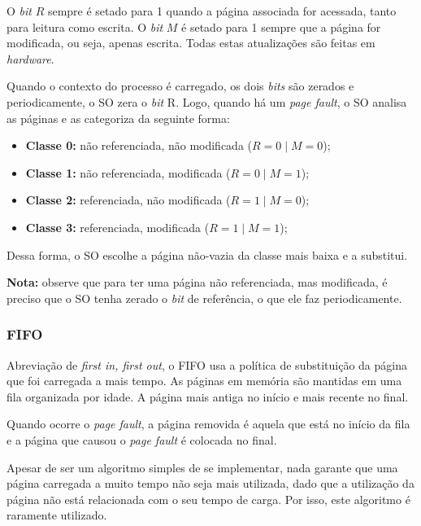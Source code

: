 O \textit{bit} $R$ sempre é setado para 1 quando a página associada for acessada, tanto para leitura como escrita. O \textit{bit} $M$ é setado para 1 sempre que a página for modificada, ou seja, apenas escrita. Todas estas atualizações são feitas em \textit{hardware}.

Quando o contexto do processo é carregado, os dois \textit{bits} são zerados e periodicamente, o SO zera o \textit{bit} R. Logo, quando há um \textit{page fault}, o SO analisa as páginas e as categoriza da seguinte forma:

\begin{itemize}
  \item \textbf{Classe 0:} não referenciada, não modificada ($R = 0 \mid M = 0$);

  \item \textbf{Classe 1:} não referenciada, modificada ($R = 0 \mid M = 1$);

  \item \textbf{Classe 2:} referenciada, não modificada ($R = 1 \mid M = 0$);

  \item \textbf{Classe 3:} referenciada, modificada ($R = 1 \mid M = 1$);
\end{itemize}

Dessa forma, o SO escolhe a página não-vazia da classe mais baixa e a substitui.

\textbf{Nota:} observe que para ter uma página não referenciada, mas modificada, é preciso que o SO tenha zerado o \textit{bit} de referência, o que ele faz periodicamente.



\subsubsection{FIFO}
Abreviação de \textit{first in, first out}, o FIFO usa a política de substituição da página que foi carregada a mais tempo. As páginas em memória são mantidas em uma fila organizada por idade. A página mais antiga no início e mais recente no final.

Quando ocorre o \textit{page fault}, a página removida é aquela que está no início da fila e a página que causou o \textit{page fault} é colocada no final.

Apesar de ser um algoritmo simples de se implementar, nada garante que uma página carregada a muito tempo não seja mais utilizada, dado que a utilização da página não está relacionada com o seu tempo de carga. Por isso, este algoritmo é raramente utilizado.




